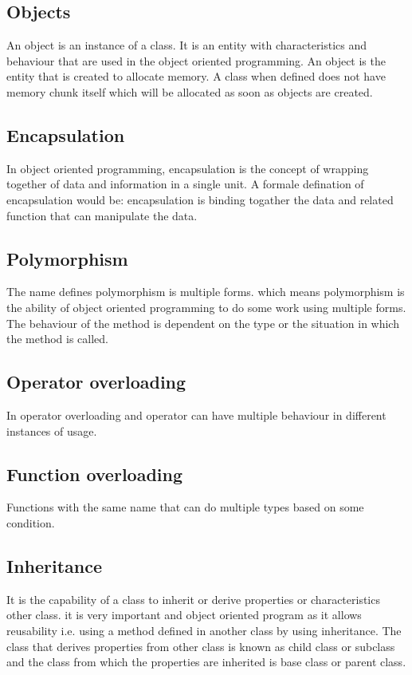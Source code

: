 \documentclass[10pt,a4paper,twoside]{article}
\begin{document}
\subsection{Objects}
\item An object is an instance of a class. It is an entity with characteristics and behaviour that are used in the object oriented programming. An object is the entity that is created to allocate memory. A class when defined does not have memory chunk itself which will be allocated as soon as objects are created.

\subsection{Encapsulation }
In object oriented programming, encapsulation is the concept of wrapping together of data and information in a single unit. A formale defination of encapsulation would be: encapsulation is binding togather the data and related function that can manipulate the data.

\subsection{Polymorphism }
The name defines polymorphism is multiple forms. which means polymorphism is the ability of object oriented programming to do some work using multiple forms. The behaviour of the method is dependent on the type or the situation in which the method is called.

\subsection{Operator overloading} 
In operator overloading and operator can have multiple behaviour in different instances of usage.

\subsection{Function overloading }
Functions with the same name that can do multiple types based on some condition.

\subsection{Inheritance} It is the capability of a class to inherit or derive properties or characteristics other class. it is very important and object oriented program as it allows reusability i.e. using a method defined in another class by using inheritance. The class that derives properties from other class is known as child class or subclass and the class from which the properties are inherited is base class or parent class.
\end{document}
